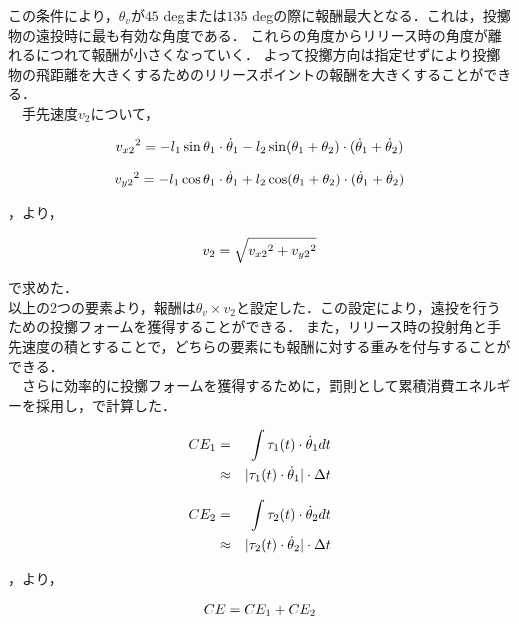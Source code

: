 この条件により，$\theta_{v}$が$45$ degまたは$135$ degの際に報酬最大となる．これは，投擲物の遠投時に最も有効な角度\cite{angle}である．
これらの角度からリリース時の角度が離れるにつれて報酬が小さくなっていく．
よって投擲方向は指定せずにより投擲物の飛距離を大きくするためのリリースポイントの報酬を大きくすることができる．\\
　手先速度$v_{2}$について，

\begin{eqnarray}
  \equlabel{2.20}
  {v_{x2}}^2=-l_{1}\sin\theta_{1}\cdot\dot{\theta}_{1}-l_2\sin(\theta_{1}+\theta_{2})\cdot(\dot{\theta}_{1}+\dot{\theta}_{2})
\end{eqnarray}

\begin{eqnarray}
  \equlabel{2.21}
  {v_{y2}}^2=-l_{1}\cos\theta_{1}\cdot\dot{\theta}_{1}+l_2\cos(\theta_{1}+\theta_{2})\cdot(\dot{\theta}_{1}+\dot{\theta}_{2})
\end{eqnarray}

，より，

\begin{eqnarray}
  \equlabel{2.22}
  v_{2}=\sqrt{{v_{x2}}^2+{v_{y2}}^2}
\end{eqnarray}

で求めた．\\

以上の2つの要素より，報酬は$\theta_{v} \times v_{2}$と設定した．この設定により，遠投を行うための投擲フォームを獲得することができる．
また，リリース時の投射角と手先速度の積とすることで，どちらの要素にも報酬に対する重みを付与することができる．\\
　さらに効率的に投擲フォームを獲得するために，罰則として累積消費エネルギーを採用し，で計算した．

\begin{eqnarray}
  \equlabel{2.23}
  CE_{1}&=&\int \tau_{1}(t)\cdot\dot{\theta}_{1} dt \nonumber \\
        &\approx&|\tau_{1}(t)\cdot\dot{\theta}_{1}|\cdot\Delta t
\end{eqnarray}

\begin{eqnarray}
  \equlabel{2.24}
  CE_{2}&=&\int \tau_{2}(t)\cdot\dot{\theta}_{2} dt \nonumber \\
        &\approx&|\tau_{2}(t)\cdot\dot{\theta}_{2}|\cdot\Delta t
\end{eqnarray}

，より，

\begin{eqnarray}
  \equlabel{2.25}
  CE = CE_{1} + CE_{2}
\end{eqnarray}

